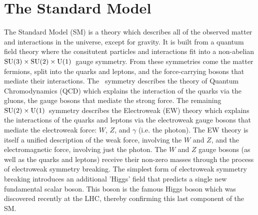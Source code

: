 






\section{The Standard Model}

The Standard Model (SM) is a theory which describes all of the
observed matter and interactions in the universe, except for gravity.
It is built from a quantum field theory where the consitutent particles
and interactions fit into a non-abelian 
$\textrm{SU(3)}\times\textrm{SU(2)}\times\textrm{U(1)}$~gauge symmetry.
From these symmetries come the matter fermions, split 
into the quarks and leptons, and the force-carrying bosons
that mediate their interactions.
The \suthree~symmetry describes the theory of Quantum Chromodynamics (QCD)
which explains the interaction of the quarks via the gluons, the
gauge bosons that mediate the strong force.
The remaining $\textrm{SU(2)}\times\textrm{U(1)}$~symmetry 
describes the Electroweak (EW) theory which explains
the interactions of the quarks and leptons via the 
electroweak gauge bosons that mediate
the electroweak force: $W$, $Z$, and $\gamma$ (i.e. the photon).
The EW theory is itself a unified description of the weak force,
involving the $W$ and $Z$, and the electromagnetic force, involving
just the photon.
The $W$ and $Z$ gauge bosons (as well as the quarks and leptons) receive
their non-zero masses through the process of electroweak symmetry
breaking. The simplest form of electroweak symmetry breaking 
introduces an additional 'Higgs' field that
predicts a single new fundamental scalar boson. This boson is the
famous Higgs boson which was discovered recently at the LHC, thereby
confirming this last component of the SM.

